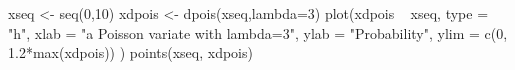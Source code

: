 \begin{Schunk}
\begin{Sinput}
  xseq <- seq(0,10)
  xdpois <- dpois(xseq,lambda=3)
  plot(xdpois ~ xseq, type = "h", xlab = "a Poisson variate with lambda=3", ylab = "Probability", ylim = c(0, 1.2*max(xdpois)) )
  points(xseq, xdpois)
\end{Sinput}
\end{Schunk}
